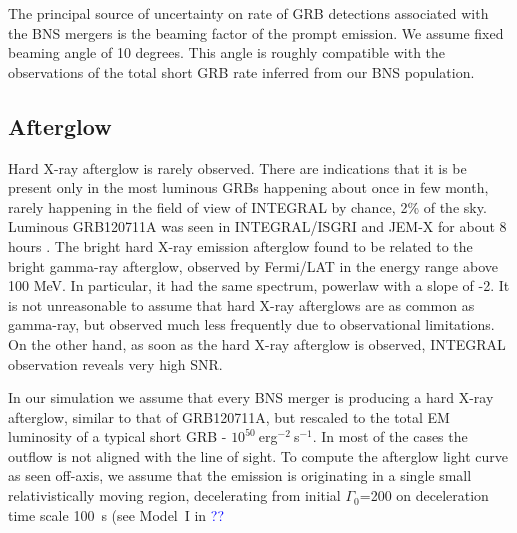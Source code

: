 \documentclass[a0,portrait]{a0poster}
\begin{document}
\begin{multicols}{2}
The principal source of uncertainty on rate of GRB detections
associated with the BNS mergers is the beaming factor of the prompt
emission. We assume fixed beaming angle of 10 degrees. This angle is
roughly compatible with the observations of the total short GRB rate
inferred from our BNS population.

\subsection*{Afterglow}

Hard X-ray afterglow is rarely observed. There are indications that it
is be present only in the most luminous GRBs happening about once in
few month, rarely happening in the field of view of INTEGRAL by
chance, 2\% of the sky. Luminous GRB120711A was seen in INTEGRAL/ISGRI
and JEM-X for about 8 hours \cite{martincarillo14}. The bright hard
X-ray emission afterglow found to be related to the bright gamma-ray
afterglow, observed by Fermi/LAT in the energy range above 100 MeV. In
particular, it had the same spectrum, powerlaw with a slope of -2. It
is not unreasonable to assume that hard X-ray afterglows are as common
as gamma-ray, but observed much less frequently due to observational
limitations. On the other hand, as soon as the hard X-ray afterglow is
observed, INTEGRAL observation reveals very high SNR.

In our simulation we assume that every BNS merger is producing a hard
X-ray afterglow, similar to that of GRB120711A, but rescaled to the
total EM luminosity of a typical short GRB -
$10^{50}~$erg$^{-2}~$s$^{-1}$. In most of the cases the outflow is not
aligned with the line of sight. To compute the afterglow light curve
as seen off-axis, we assume that the emission is originating in a
single small relativistically moving region, decelerating from
initial $\Gamma_0$=200 on deceleration time scale 100~s (see Model~I
in \textcolor{blue}{??}%




\end{multicols}
\end{document}
